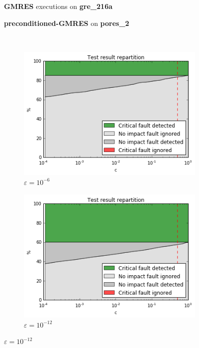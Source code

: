 \begin{figure}[h]
	\centering
    
\begin{minipage}[b]{0.45\linewidth}
\centering
\textbf{GMRES} executions on \textbf{gre_216a} 
\end{minipage}
\quad
\begin{minipage}{0.45\linewidth}
\centering
\textbf{preconditioned-GMRES} on \textbf{pores_2}
\end{minipage}\\


    \begin{minipage}[b]{0.48\linewidth}
	
	\begin{subfigure}[t]{\linewidth}
		\centering
		\includegraphics[width=1.1\linewidth]{figures/gre_216a/test_result_oracle_0.png}
		\caption{$\varepsilon = 10^{-6}$}\label{fig:gre_216a_test_result_oracle_0}	
	\end{subfigure}
    \quad
    \begin{subfigure}[t]{\linewidth}
		\centering
		\includegraphics[width=1.1\linewidth]{figures/gre_216a/test_result_oracle_1.png}
		\caption{$\varepsilon = 10^{-12}$}\label{fig:gre_216a_test_result_oracle_1}	
	\end{subfigure}
    \end{minipage}
    \quad
    \begin{minipage}[b]{0.48\linewidth}
    	

\end{minipage}
\end{figure}
